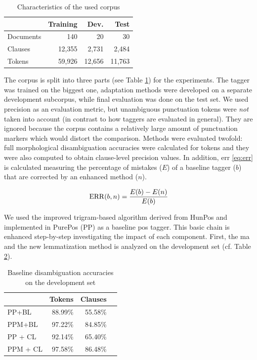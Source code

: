 \begin{table}[H]
\centering
\caption{Characteristics of the used corpus}\label{tab:oldhun-corpus}
\begin{tabular}{l r r r}
\hline
& Training & Dev. & Test \\
\hline
Documents & 140 & 20 & 30 \\
Clauses & 12,355 & 2,731 & 2,484 \\
Tokens & 59,926 & 12,656 &  11,763\\
\hline
\end{tabular}
\end{table}

The corpus is split into three parts (see Table \ref{tab:oldhun-corpus}) for the experiments. 
The tagger was trained on the biggest one, adaptation methods were developed on a separate development subcorpus, while final evaluation was done on the test set.
We used precision as an evaluation metric, but unambiguous punctuation tokens were \emph{not} taken into account (in contrast to how taggers are evaluated in general). 
They are ignored because the corpus contains a relatively large amount of punctuation markers which would distort the comparison.
Methods were evaluated twofold: full morphological disambiguation accuracies were calculated for tokens and they were also computed to obtain clause-level precision values. 
In addition, \gls{err} \eqref{eq:err} is calculated measuring the percentage of mistakes ($E$) of a baseline tagger ($b$) that are corrected by an enhanced method ($n$). 

\begin{equation}\label{eq:err}
\operatorname{ERR}(b,n) = \frac{E(b)-E(n)}{E(b)}
\end{equation}

We used the improved trigram-based algorithm derived from HunPos and implemented in PurePos (PP) as a baseline \gls{pos} tagger. 
This basic chain is enhanced step-by-step investigating the impact of each component.
First, the \acrshort{ma} and the new lemmatization method is analyzed on the development set (cf. Table \ref{tab:oldhun-baselines}). 

\begin{table}[H]
\centering
\caption{Baseline disambiguation accuracies on the development set}\label{tab:oldhun-baselines}
\begin{tabular}{l r r r}
\hline
 & Tokens & Clauses \\
\hline
PP+BL  & 88.99\% & 55.58\% \\
PPM+BL  & 97.22\% & 84.85\% \\
PP + CL & 92.14\% & 65.40\% \\
PPM + CL & 97.58\% & 86.48\% \\
\hline
\end{tabular}
\end{table}


